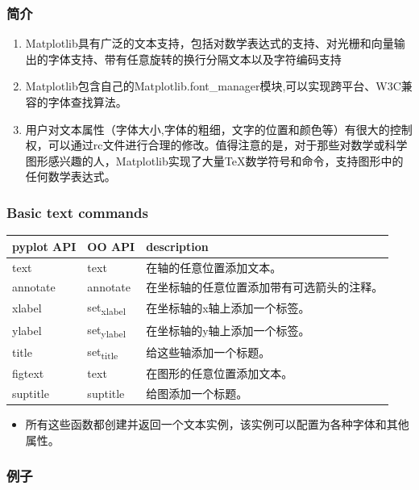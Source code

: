 \documentclass[UTF8,a4paper,12pt]{ctexart}  %
\providecommand{\tightlist}{\setlength{\itemsep}{0pt}\setlength{\parskip}{0pt}}
\begin{document}
\hypertarget{ux7b80ux4ecb-2}{%
\subsubsection{简介}\label{ux7b80ux4ecb-2}}

\begin{enumerate}
\def\labelenumi{\arabic{enumi}.}
\item
  Matplotlib具有广泛的文本支持，包括对数学表达式的支持、对光栅和向量输出的字体支持、带有任意旋转的换行分隔文本以及字符编码支持
\item
  Matplotlib包含自己的Matplotlib.font\_manager模块,可以实现跨平台、W3C兼容的字体查找算法。
\item
  用户对文本属性（字体大小,字体的粗细，文字的位置和颜色等）有很大的控制权，可以通过rc文件进行合理的修改。值得注意的是，对于那些对数学或科学图形感兴趣的人，Matplotlib实现了大量TeX数学符号和命令，支持图形中的任何数学表达式。
\end{enumerate}

\hypertarget{basic-text-commands}{%
\subsubsection{Basic text commands}\label{basic-text-commands}}

\begin{longtable}[]{@{}lll@{}}
\toprule
pyplot API & OO API & description\tabularnewline
\midrule
\endhead
text & text & 在轴的任意位置添加文本。\tabularnewline
annotate & annotate & 在坐标轴的任意位置添加带有可选箭头的注释。\tabularnewline
xlabel & set\textsubscript{xlabel} & 在坐标轴的x轴上添加一个标签。\tabularnewline
ylabel & set\textsubscript{ylabel} & 在坐标轴的y轴上添加一个标签。\tabularnewline
title & set\textsubscript{title} & 给这些轴添加一个标题。\tabularnewline
figtext & text & 在图形的任意位置添加文本。\tabularnewline
suptitle & suptitle & 给图添加一个标题。\tabularnewline
\bottomrule
\end{longtable}

\begin{itemize}
\tightlist
\item
  所有这些函数都创建并返回一个文本实例，该实例可以配置为各种字体和其他属性。
\end{itemize}

\hypertarget{ux4f8bux5b50-12}{%
\subsubsection{例子}\label{ux4f8bux5b50-12}}
\end{document}
